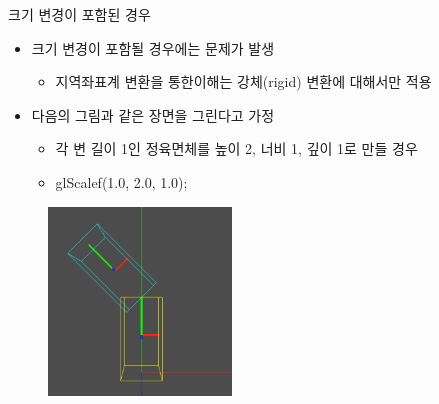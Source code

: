 \documentclass{beamer}
\begin{document}
\begin{frame}[fragile]{크기 변경이 포함된 경우}

{\small
\begin{itemize}
\item 크기 변경이 포함될 경우에는 문제가 발생
	\begin{itemize}
	\item 지역좌표계 변환을 통한이해는 강체(rigid) 변환에 대해서만 적용
	\end{itemize}
\item 다음의 그림과 같은 장면을 그린다고 가정
	\begin{itemize}
	\item 각 변 길이 1인 정육면체를 높이 2, 너비 1, 깊이 1로 만들 경우
	\item glScalef(1.0, 2.0, 1.0);
	\end{itemize}
\end{itemize}
}
\begin{figure}
    \includegraphics[height=5cm]{OGL_transform/noScale.png}
\end{figure}

\end{frame}
\end{document}
